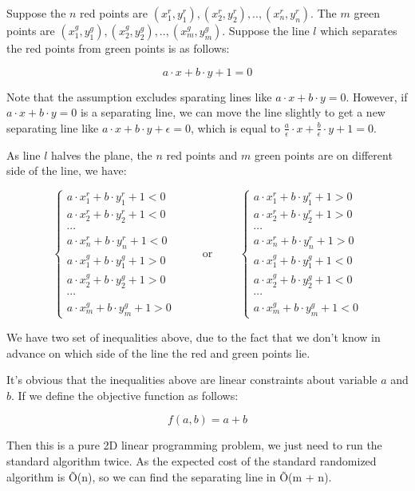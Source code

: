 
Suppose the $n$ red points are $(x_1^r, y_1^r), (x_2^r, y_2^r), .., (x_n^r, y_n^r)$. The $m$ green points are $(x_1^g, y_1^g), (x_2^g, y_2^g), .., (x_m^g, y_m^g)$. Suppose the line $l$ which separates the red points from green points is as follows:

\[
  a \cdot x + b \cdot y + 1 = 0
\]

Note that the assumption excludes sparating lines like $a \cdot x + b \cdot y = 0$. However, if $a \cdot x + b \cdot y = 0$ is a separating line, we can move the line slightly to get a new separating line like $a \cdot x + b \cdot y + \epsilon = 0$, which is equal to $\frac{a}{\epsilon} \cdot x + \frac{b}{\epsilon} \cdot y + 1 = 0$.

As line $l$ halves the plane, the $n$ red points and $m$ green points are on different side of the line, we have:

\[
  \left\{
      \begin{array}{l}
          a \cdot x_1^r + b \cdot y_1^r + 1 < 0 \\
          a \cdot x_2^r + b \cdot y_2^r + 1 < 0 \\
          \cdots \\
          a \cdot x_n^r + b \cdot y_n^r + 1 < 0 \\
          a \cdot x_1^g + b \cdot y_1^g + 1 > 0 \\
          a \cdot x_2^g + b \cdot y_2^g + 1 > 0 \\
          \cdots \\
          a \cdot x_m^g + b \cdot y_m^g + 1 > 0
      \end{array}
  \right.
  \hspace{1cm}\text{or}\hspace{1cm}
  \left\{
      \begin{array}{l}
          a \cdot x_1^r + b \cdot y_1^r + 1 > 0 \\
          a \cdot x_2^r + b \cdot y_2^r + 1 > 0 \\
          \cdots \\
          a \cdot x_n^r + b \cdot y_n^r + 1 > 0 \\
          a \cdot x_1^g + b \cdot y_1^g + 1 < 0 \\
          a \cdot x_2^g + b \cdot y_2^g + 1 < 0 \\
          \cdots \\
          a \cdot x_m^g + b \cdot y_m^g + 1 < 0
      \end{array}
  \right.
\]

We have two set of inequalities above, due to the fact that we don't know in advance on which side of the line the red and green points lie.

It's obvious that the inequalities above are linear constraints about variable $a$ and $b$. If we define the objective function as follows:

\[
  f(a, b) = a + b
\]

Then this is a pure 2D linear programming problem, we just need to run the standard algorithm twice. As the expected cost of the standard randomized algorithm is \~O(n), so we can find the separating line in \~O(m + n).